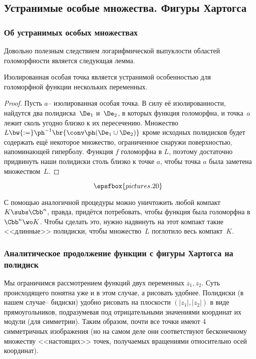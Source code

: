 \documentclass[a4paper]{article}
\begin{document}
\subsection{Устранимые особые множества. Фигуры Хартогса}

\subsubsection{Об устранимых особых множествах}

Довольно полезным следствием логарифмической выпуклости областей голоморфности является
следующая лемма.

\begin{lemma}
Изолированная особая точка является устранимой особенностью для голоморфной функции
нескольких переменных.
\end{lemma}
\begin{proof}
Пусть $a$-- изолированная особая точка. В силу её изолированности, найдутся два
полидиска~$\De_1$ и~$\De_2$, в которых функция голоморфна, и точка~$a$ лежит сколь
угодно близко к их пересечению. Множество $L \bw{:=} \ph^{-1}\br{\conv\ph(\De_1 \cup \De_2)}$
кроме исходных полидисков будет содержать ещё некоторое множество, ограниченное снаружи
поверхностью, напоминающей гиперболу. Функция $f$ голоморфна в $L$, поэтому достаточно
придвинуть наши полидиски столь близко к точке $a$, чтобы точка $a$ была заметена множеством~$L$.
\end{proof}

$$\epsfbox{pictures.20}$$

\begin{note}
С помощью аналогичной процедуры можно уничтожить любой компакт $K \subs \Cbb^n$, правда,
придётся потребовать, чтобы функция была голоморфна в $\Cbb^n \wo K$. Чтобы сделать это,
нужно надвинуть на этот компакт такие <<длинные>> полидиски, чтобы множество~$L$ поглотило
весь компакт~$K$.
\end{note}

\subsubsection{Аналитическое продолжение функции с фигуры Хартогса на полидиск}

Мы ограничимся рассмотрением функций двух переменных $z_1,z_2$. Суть происходящего понятна уже
и в этом случае, а рисовать удобнее. Полидиски (в нашем случае-- бидиски) удобно рисовать на плоскости
$(|z_1|, |z_2|)$ в виде прямоугольников, подразумевая под отрицательными значениями координат их модули
(для симметрии). Таким образом, почти все точки имеют 4 симметричных изображения (но на самом деле они
соответствуют бесконечному множеству <<настоящих>> точек, получаемых вращениями относительно осей координат).
\end{document}

